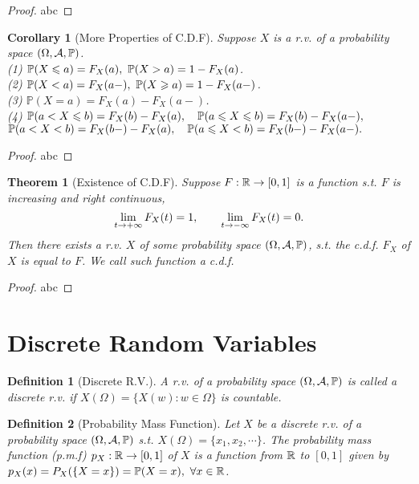 \documentclass[openany,12pt]{book}
\newtheorem{theorem}{Theorem}[chapter]
\newtheorem{corollary}{Corollary}[chapter]
\newtheorem{definition}{Definition}[chapter]
\begin{document}
\begin{proof}
  abc
\end{proof}

\begin{corollary}[More Properties of C.D.F]
Suppose $X$ is a r.v. of a probability space $(\Omega,\mathcal{A},\mathbb{P})$.\\
(1) $\mathbb{P}(X\ls a)=F_X (a),\ \mathbb{P}(X>a)=1-F_X (a)$.\\
(2) $\mathbb{P}(X<a)=F_X (a-),\ \mathbb{P}(X\gs a)=1-F_X (a-)$.\\
(3) $\mathbb{P}(X=a)=F_X (a)-F_X (a-)$.\\
(4) $\mathbb{P}(a<X\leqslant b)=F_X (b)-F_X (a),\quad \mathbb{P}(a\leqslant X\leqslant b)=F_X (b)-F_X (a-),$\\
\quad$\mathbb{P}(a<X<b)=F_X (b-)-F_X (a),\quad \mathbb{P}(a\leqslant X<b)=F_X (b-)-F_X (a-).$
\end{corollary}

\begin{proof}
  abc
\end{proof}

\begin{theorem}[Existence of C.D.F]
Suppose $F: \mathbb{R}\to[0,1]$ is a function s.t. $F$ is increasing and right continuous, 
$$\lim_{t\to+\infty} F_X (t)=1,\qquad\lim_{t\to-\infty} F_X (t)=0.$$
Then there exists a r.v. $X$ of some probability space $(\Omega,\mathcal{A},\mathbb{P})$,
s.t. the c.d.f. $F_X$ of $X$ is equal to $F$. We call such function a c.d.f.
\end{theorem}

\begin{proof}
  abc
\end{proof}

\section{Discrete Random Variables}

\begin{definition}[Discrete R.V.]
A r.v. of a probability space $(\Omega,\mathcal{A},\mathbb{P})$ is called a discrete r.v. if $X(\Omega)=\{X(w):w\in\Omega\}$ is countable.
\end{definition}

\begin{definition}[Probability Mass Function]
Let $X$ be a discrete r.v. of a probability space $(\Omega,\mathcal{A},\mathbb{P})$ s.t. $X(\Omega)=\{x_1,x_2,\cdots\}$. The probability mass function (p.m.f) $p_X: \mathbb{R}\to[0,1]$ of $X$ is a function from $\mathbb{R}$ to $[0,1]$ given by $p_X (x)=P_X (\{X=x\})=\mathbb{P}(X=x),\ \forall x\in\mathbb{R}$.
\end{definition}
\end{document}
